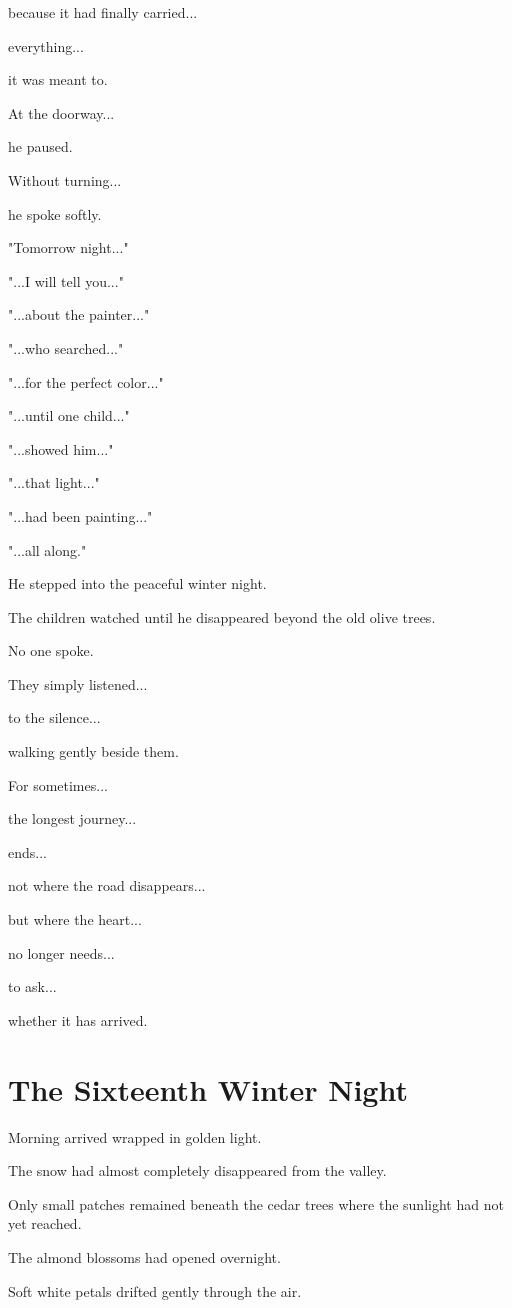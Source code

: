 \documentclass[12pt,openany]{book}
\begin{document}
because it had finally carried...

everything...

it was meant to.

At the doorway...

he paused.

Without turning...

he spoke softly.

"Tomorrow night..."

"...I will tell you..."

"...about the painter..."

"...who searched..."

"...for the perfect color..."

"...until one child..."

"...showed him..."

"...that light..."

"...had been painting..."

"...all along."

He stepped into the peaceful winter night.

The children watched until he disappeared beyond the old olive trees.

No one spoke.

They simply listened...

to the silence...

walking gently beside them.

For sometimes...

the longest journey...

ends...

not where the road disappears...

but where the heart...

no longer needs...

to ask...

whether it has arrived.
\chapter{The Sixteenth Winter Night}

Morning arrived wrapped in golden light.

The snow had almost completely disappeared from the valley.

Only small patches remained beneath the cedar trees where the sunlight had not yet reached.

The almond blossoms had opened overnight.

Soft white petals drifted gently through the air.
\end{document}

